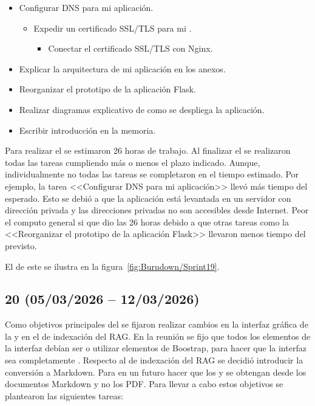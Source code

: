 \begin{itemize}
\tightlist
	\item Configurar DNS para mi aplicación. 
	\begin{itemize}
	\tightlist
		\item Expedir un certificado SSL/TLS para mi .
		\begin{itemize}
		\tightlist
			\item Conectar el certificado SSL/TLS con Nginx.
		\end{itemize}
	\end{itemize}
	\item Explicar la arquitectura de mi aplicación en los anexos.
	\item Reorganizar el prototipo de la aplicación Flask.
	\item Realizar diagramas explicativo de como se despliega la aplicación.
	\item Escribir introducción en la memoria.
\end{itemize}

Para realizar el  se estimaron 26 horas de trabajo. Al finalizar el  se realizaron todas las tareas cumpliendo más o menos el plazo indicado. Aunque, individualmente no todas las tareas se completaron en el tiempo estimado. Por ejemplo, la tarea <<Configurar DNS para mi aplicación>> llevó más tiempo del esperado. Esto se debió a que la aplicación está levantada en un servidor con dirección privada y las direcciones privadas no son accesibles desde Internet. Peor el computo general si que dio las 26 horas debido a que otras tareas como la <<Reorganizar el prototipo de la aplicación Flask>> llevaron menos tiempo del previsto. 

El  de este  se ilustra en la figura~\ref{fig:Burndown/Sprint19}.

\subsection{ 20 (05/03/2026 -- 12/03/2026)}
Como objetivos principales del  se fijaron realizar cambios en la interfaz gráfica de la  y en el  de indexación del RAG. En la reunión se fijo que todos los elementos de la interfaz debían ser o utilizar elementos de Boostrap, para hacer que la interfaz sea completamente . Respecto al  de indexación del RAG se decidió introducir la conversión a Markdown. Para en un futuro  hacer que los  y  se obtengan desde los documentos Markdown y no los PDF. Para llevar a cabo estos objetivos se plantearon las siguientes tareas:

